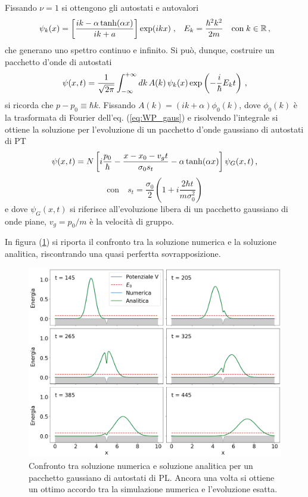 Fissando  $\nu = 1$ si ottengono gli autostati e autovalori
\begin{equation}
    \centering
    \psi_{k}(x) = \left[ \frac{i k - \alpha \tanh (\alpha x)}{ik + a}\right] \exp(ikx)  \; \text{,} \quad E_k = \frac{\hbar^2 k^2}{2 m } \quad \text{con} \; k \in \mathbb{R} \, \text{,}
\end{equation}
che generano uno spettro continuo e infinito. Si può, dunque, costruire un pacchetto d'onde di autostati 
\begin{equation}
    \centering
    \psi(x, t) = \frac{1}{\sqrt{2 \pi}} \int_{-\infty}^{+\infty} dk \, A(k) \, \psi_{k}(x) \exp \left(- \frac{i}{\hbar} E_k t \right) \, \text{,}
    \label{eq:WP_RL_def}
\end{equation}
si ricorda che $p - p_0 \equiv \hbar k$.
Fissando $A(k) = (ik + \alpha) \phi_0(k)$, dove $\phi_0(k)$ è la trasformata di Fourier dell'eq. (\ref{eq:WP_gaus}) e risolvendo l'integrale si ottiene la soluzione per l'evoluzione di un pacchetto d'onde gaussiano di autostati di PT
\begin{equation}
    \centering
    \psi(x, t) = N \left[i \frac{p_0}{\hbar} - \frac{x - x_0 - v_{g}t}{ \sigma_0 s_t} - \alpha \tanh (\alpha x) \right] \psi_{G}(x,t)    \, \text{,}
    \label{eq:WP_RL_ev}
\end{equation}
\begin{equation}
\text{con} \quad s_t = \frac{\sigma_0}{2} \left(1 + i \frac{2 \hbar t}{ m \sigma_0^2} \right)
\end{equation}
e dove $\psi_{G}(x,t)$ si riferisce all'evoluzione libera di un pacchetto gaussiano di onde piane, $v_g = p_0 / m$ è la velocità di gruppo.\cite{Mousavi:PL_WP}

In figura (\ref{fig:WP_RL}) si riporta il confronto tra la soluzione numerica e la soluzione analitica, riscontrando una quasi perfertta sovrapposizione.

\begin{figure}
    \centering
    \includegraphics[width = \textwidth]{immagini/WP_RL.png}
    \caption{Confronto tra soluzione numerica e soluzione analitica per un pacchetto gaussiano di autostati di PL. Ancora una volta si ottiene un ottimo accordo tra la simulazione numerica e l'evoluzione esatta.}
    \label{fig:WP_RL}
\end{figure}

